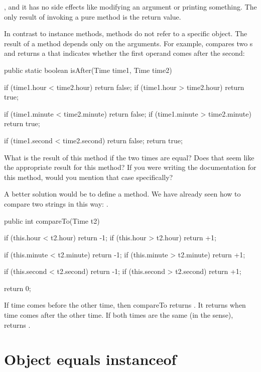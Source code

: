 
, and it has no side effects like modifying an argument or printing something.
The only result of invoking a pure method is the return value.

In contrast to instance methods,  methods do not refer to a specific object.
The result of a  method depends only on the arguments.
For example,  compares two s and returns a  that indicates whether the first operand comes after the second:

\begin{code}
public static boolean isAfter(Time time1, Time time2) {
    if (time1.hour < time2.hour) return false;
    if (time1.hour > time2.hour) return true;

    if (time1.minute < time2.minute) return false;
    if (time1.minute > time2.minute) return true;

    if (time1.second < time2.second) return false;
    return true;
}
\end{code}

What is the result of this method if the two times are equal?
Does that seem like the appropriate result for this method?
If you were writing the documentation for this method, would you mention that case specifically?

A better solution would be to define a  method.
We have already seen how to compare two strings in this way: .

\begin{code}
public int compareTo(Time t2) {
    if (this.hour < t2.hour) return -1;
    if (this.hour > t2.hour) return +1;

    if (this.minute < t2.minute) return -1;
    if (this.minute > t2.minute) return +1;

    if (this.second < t2.second) return -1;
    if (this.second > t2.second) return +1;

    return 0;
}
\end{code}

If  time comes before the other time, then compareTo returns .
It returns  when  time comes after the other time.
If both times are the same (in the  sense),  returns .


\section{Object equals instanceof}

